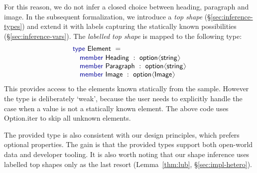 \documentclass[10pt,preprint,clearpagebib]{sigplanconf}
\newcommand{\langl}{\begin{picture}(4.5,7)
\put(1.1,2.5){\rotatebox{60}{\line(1,0){5.5}}}
\put(1.1,2.5){\rotatebox{300}{\line(1,0){5.5}}}
\end{picture}}
\newcommand{\rangl}{\begin{picture}(4.5,7)
\put(.9,2.5){\rotatebox{120}{\line(1,0){5.5}}}
\put(.9,2.5){\rotatebox{240}{\line(1,0){5.5}}}
\end{picture}}
\newcommand{\kvd}[1]{\textnormal{\textcolor{kvdclr}{\sffamily #1}}}
\newcommand{\ident}[1]{\textnormal{\sffamily #1}}
\begin{document}
For this reason, we do not infer a closed choice between heading, paragraph and image. In the 
subsequent formalization, we introduce a \emph{top shape} (\S\ref{sec:inference-types}) and extend 
it with labels capturing the statically known possibilities (\S\ref{sec:inference-vars}). The 
\emph{labelled top shape} is mapped to the following type:
%
\begin{equation*}
\begin{array}{l}
 \kvd{type}~\ident{Element}~=  \\[0.1em]
 \quad \kvd{member}~\ident{Heading}~:~\ident{option}\langl \ident{string} \rangl\\
 \quad \kvd{member}~\ident{Paragraph}~:~\ident{option}\langl \ident{string} \rangl\\
 \quad \kvd{member}~\ident{Image}~:~\ident{option}\langl \ident{Image} \rangl\\
\end{array}
\end{equation*}
%
This provides access to the elements known statically from the sample. However the type is 
deliberately `weak', because the user needs to explicitly handle the case when a value is not 
a statically known element. The above code uses \ident{Option.iter} to skip all unknown elements. 

The provided type is also consistent with our design principles, which prefers optional properties. 
The gain is that the provided types support both open-world data and developer tooling. It is also 
worth noting that our shape inference uses labelled top shapes only as the last resort 
(Lemma~\ref{thm:lub}, \S\ref{sec:impl-hetero}).

\end{document}
